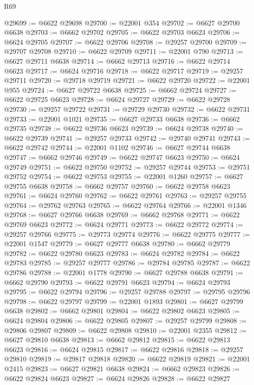 \begin{lexlean}{R69}
\begin{coremodule}
{@29699 := @6622 @29698
@29700 := @22001 @354
@29702 := @6627 @29700 @6638
@29703 := @6662 @29702
@29705 := @6622 @29703 @6623
@29706 := @6624 @29705
@29707 := @6622 @29706
@29708 := @29257 @29700
@29709 := @29707 @29708
@29710 := @6622 @29709
@29711 := @22001 @790
@29713 := @6627 @29711 @6638
@29714 := @6662 @29713
@29716 := @6622 @29714 @6623
@29717 := @6624 @29716
@29718 := @6622 @29717
@29719 := @29257 @29711
@29720 := @29718 @29719
@29721 := @6622 @29720
@29722 := @22001 @955
@29724 := @6627 @29722 @6638
@29725 := @6662 @29724
@29727 := @6622 @29725 @6623
@29728 := @6624 @29727
@29729 := @6622 @29728
@29730 := @29257 @29722
@29731 := @29729 @29730
@29732 := @6622 @29731
@29733 := @22001 @1021
@29735 := @6627 @29733 @6638
@29736 := @6662 @29735
@29738 := @6622 @29736 @6623
@29739 := @6624 @29738
@29740 := @6622 @29739
@29741 := @29257 @29733
@29742 := @29740 @29741
@29743 := @6622 @29742
@29744 := @22001 @1102
@29746 := @6627 @29744 @6638
@29747 := @6662 @29746
@29749 := @6622 @29747 @6623
@29750 := @6624 @29749
@29751 := @6622 @29750
@29752 := @29257 @29744
@29753 := @29751 @29752
@29754 := @6622 @29753
@29755 := @22001 @1260
@29757 := @6627 @29755 @6638
@29758 := @6662 @29757
@29760 := @6622 @29758 @6623
@29761 := @6624 @29760
@29762 := @6622 @29761
@29763 := @29257 @29755
@29764 := @29762 @29763
@29765 := @6622 @29764
@29766 := @22001 @1346
@29768 := @6627 @29766 @6638
@29769 := @6662 @29768
@29771 := @6622 @29769 @6623
@29772 := @6624 @29771
@29773 := @6622 @29772
@29774 := @29257 @29766
@29775 := @29773 @29774
@29776 := @6622 @29775
@29777 := @22001 @1547
@29779 := @6627 @29777 @6638
@29780 := @6662 @29779
@29782 := @6622 @29780 @6623
@29783 := @6624 @29782
@29784 := @6622 @29783
@29785 := @29257 @29777
@29786 := @29784 @29785
@29787 := @6622 @29786
@29788 := @22001 @1778
@29790 := @6627 @29788 @6638
@29791 := @6662 @29790
@29793 := @6622 @29791 @6623
@29794 := @6624 @29793
@29795 := @6622 @29794
@29796 := @29257 @29788
@29797 := @29795 @29796
@29798 := @6622 @29797
@29799 := @22001 @1893
@29801 := @6627 @29799 @6638
@29802 := @6662 @29801
@29804 := @6622 @29802 @6623
@29805 := @6624 @29804
@29806 := @6622 @29805
@29807 := @29257 @29799
@29808 := @29806 @29807
@29809 := @6622 @29808
@29810 := @22001 @2355
@29812 := @6627 @29810 @6638
@29813 := @6662 @29812
@29815 := @6622 @29813 @6623
@29816 := @6624 @29815
@29817 := @6622 @29816
@29818 := @29257 @29810
@29819 := @29817 @29818
@29820 := @6622 @29819
@29821 := @22001 @2415
@29823 := @6627 @29821 @6638
@29824 := @6662 @29823
@29826 := @6622 @29824 @6623
@29827 := @6624 @29826
@29828 := @6622 @29827
}
\end{coremodule}
\end{lexlean}
